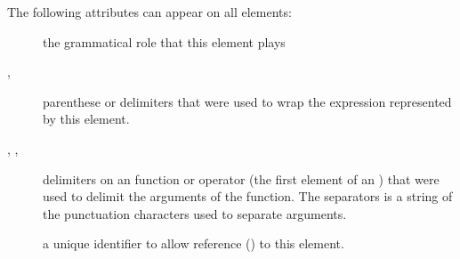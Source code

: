 \documentclass{report}
\begin{document}
The following attributes can appear on all  elements:
\begin{description}
\item[] the grammatical role that this element plays 
\item[, ] parenthese or delimiters that were used to wrap the
   expression represented by this element.
\item[, , ] delimiters on an function or operator
   (the first element of an )  that were used to delimit the arguments of the function.
    The separators is a string of the punctuation characters used to separate arguments.
\item[] a unique identifier to allow reference () to this element.
\end{description}
\end{document}
